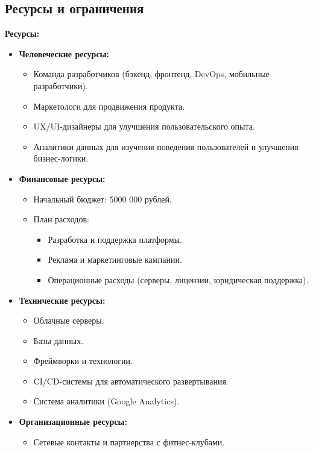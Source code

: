 \documentclass[14pt, russian]{matmex-diploma-custom}
\begin{document}
\subsection{Ресурсы и ограничения}
\textbf{Ресурсы:}
\begin{itemize}
    \item \textbf{Человеческие ресурсы:}
    \begin{itemize}
        \item Команда разработчиков (бэкенд, фронтенд, DevOps, мобильные разработчики).
        \item Маркетологи для продвижения продукта.
        \item UX/UI-дизайнеры для улучшения пользовательского опыта.
        \item Аналитики данных для изучения поведения пользователей и улучшения бизнес-логики.
    \end{itemize}

    \item \textbf{Финансовые ресурсы:}
    \begin{itemize}
        \item Начальный бюджет: 5000 000 рублей.
        \item План расходов:
            \begin{itemize}
                \item Разработка и поддержка платформы.
                \item Реклама и маркетинговые кампании.
                \item Операционные расходы (серверы, лицензии, юридическая поддержка).
            \end{itemize}
    \end{itemize}

    \item \textbf{Технические ресурсы:}
    \begin{itemize}
        \item Облачные серверы.
        \item Базы данных.
        \item Фреймворки и технологии.
        \item CI/CD-системы для автоматического развертывания.
        \item Система аналитики (Google Analytics).
    \end{itemize}

    \item \textbf{Организационные ресурсы:}
    \begin{itemize}
        \item Сетевые контакты и партнерства с фитнес-клубами.
    \end{itemize}
\end{itemize}
\end{document}
